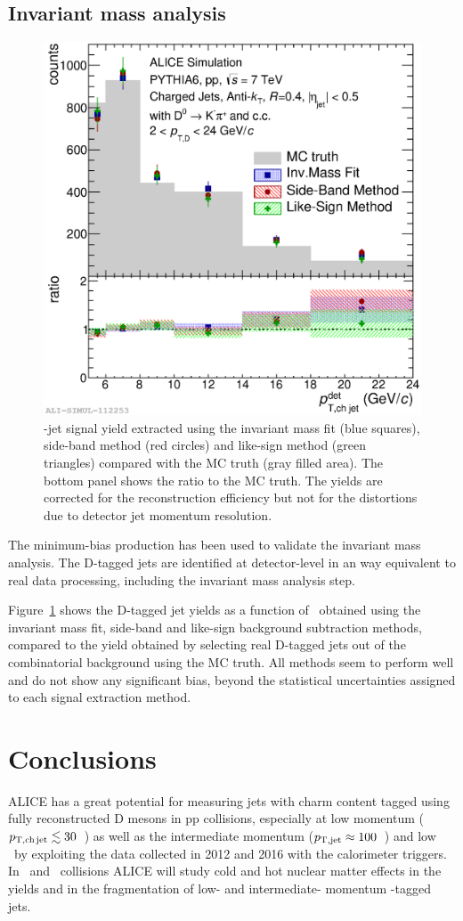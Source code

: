 \documentclass[a4paper]{jpconf}
\begin{document}
\subsection{Invariant mass analysis}
\begin{figure}[tb]
\includegraphics[width=.57\textwidth]{img/HQ16_Simulation_MethodComparison}\hspace{1pc}%
\begin{minipage}[b]{.39\textwidth}\caption{\label{fig:HQ16_Simulation_MethodComparison}\Dzero-jet signal yield extracted using the invariant mass fit (blue squares), side-band method (red circles) and like-sign method (green triangles)
compared with the MC truth (gray filled area). The bottom panel shows the ratio to the MC truth. The yields are corrected for the reconstruction efficiency but not for the distortions due to detector jet momentum resolution.}
\end{minipage}
\end{figure}

The minimum-bias production has been used to validate the invariant mass analysis. 
The D-tagged jets are identified at detector-level in an way equivalent to real data processing, including the invariant mass analysis step.

Figure~\ref{fig:HQ16_Simulation_MethodComparison} shows the D-tagged jet yields as a function of \ptchjetdet\ obtained using the invariant mass fit, side-band and like-sign background subtraction methods, compared to the yield obtained by selecting real D-tagged jets out of the 
combinatorial background using the MC truth. All methods seem to perform well and do not show any significant bias, beyond the statistical uncertainties assigned to each signal extraction method.

\section{Conclusions}
ALICE has a great potential for measuring jets with charm content tagged using fully reconstructed D mesons in pp collisions, especially at low momentum ($p_{\mathrm{T,ch\, jet}} \lesssim 30$~\GeVc)
as well as the intermediate momentum ($p_{\mathrm{T,jet}}\approx100$~\GeVc) and
low \zpar\ by exploiting the data collected in 2012 and 2016 with the calorimeter triggers.
In \PbPb\ and \pPb\ collisions ALICE will study cold and hot nuclear matter effects
in the yields and in the fragmentation of low- and intermediate- momentum \Dzero-tagged jets.
\end{document}

